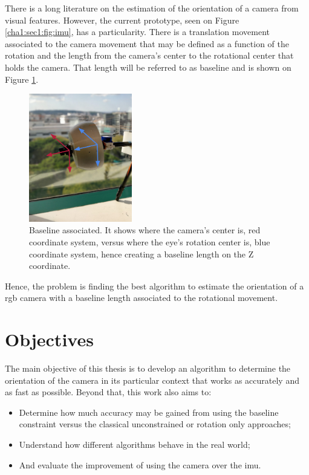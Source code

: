 There is a long literature on the estimation of the orientation of a camera from visual features. However, the current prototype, seen on Figure \ref{cha1:sec1:fig:imu}, has a particularity. There is a translation movement associated to the camera movement that may be defined as a function of the rotation and the length from the camera's center to the rotational center that holds the camera. That length will be referred to as baseline and is shown on Figure \ref{cha1:sec1:fig:baseline}.

\begin{figure}[ht]
	\centering
	\includegraphics[width=0.4\textwidth]{images/prototypeaxis.png}
	\caption[Baseline associated]{Baseline associated. It shows where the camera's center is, red coordinate system, versus where the eye's rotation center is, blue coordinate system, hence creating a baseline length on the Z coordinate.}
	\label{cha1:sec1:fig:baseline}
\end{figure}

Hence, the problem is finding the best algorithm to estimate the orientation of a \acrshort{rgb} camera with a baseline length associated to the rotational movement.

\section{Objectives}
\label{cha1:objectives}

The main objective of this thesis is to develop an algorithm to determine the orientation of the camera in its particular context that works as accurately and as fast as possible. Beyond that, this work also aims to:
\begin{itemize}
\item Determine how much accuracy may be gained from using the baseline constraint versus the classical unconstrained or rotation only approaches;
\item Understand how different algorithms behave in the real world;
\item And evaluate the improvement of using the camera over the  \acrshort{imu}.
\end{itemize}

